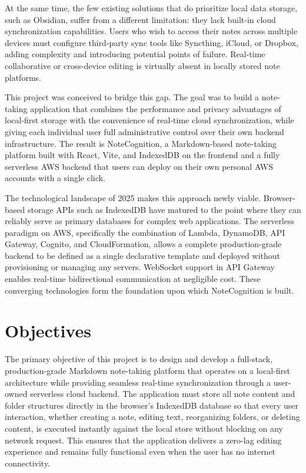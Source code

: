 \documentclass[12pt, a4paper, oneside]{report}
\begin{document}
At the same time, the few existing solutions that do prioritize local data storage, such as Obsidian, suffer from a different limitation: they lack built-in cloud synchronization capabilities. Users who wish to access their notes across multiple devices must configure third-party sync tools like Syncthing, iCloud, or Dropbox, adding complexity and introducing potential points of failure. Real-time collaborative or cross-device editing is virtually absent in locally stored note platforms.

This project was conceived to bridge this gap. The goal was to build a note-taking application that combines the performance and privacy advantages of local-first storage with the convenience of real-time cloud synchronization, while giving each individual user full administrative control over their own backend infrastructure. The result is NoteCognition, a Markdown-based note-taking platform built with React, Vite, and IndexedDB on the frontend and a fully serverless AWS backend that users can deploy on their own personal AWS accounts with a single click.

The technological landscape of 2025 makes this approach newly viable. Browser-based storage APIs such as IndexedDB have matured to the point where they can reliably serve as primary databases for complex web applications. The serverless paradigm on AWS, specifically the combination of Lambda, DynamoDB, API Gateway, Cognito, and CloudFormation, allows a complete production-grade backend to be defined as a single declarative template and deployed without provisioning or managing any servers. WebSocket support in API Gateway enables real-time bidirectional communication at negligible cost. These converging technologies form the foundation upon which NoteCognition is built.

\section{Objectives}

The primary objective of this project is to design and develop a full-stack, production-grade Markdown note-taking platform that operates on a local-first architecture while providing seamless real-time synchronization through a user-owned serverless cloud backend. The application must store all note content and folder structures directly in the browser's IndexedDB database so that every user interaction, whether creating a note, editing text, reorganizing folders, or deleting content, is executed instantly against the local store without blocking on any network request. This ensures that the application delivers a zero-lag editing experience and remains fully functional even when the user has no internet connectivity.
\end{document}
